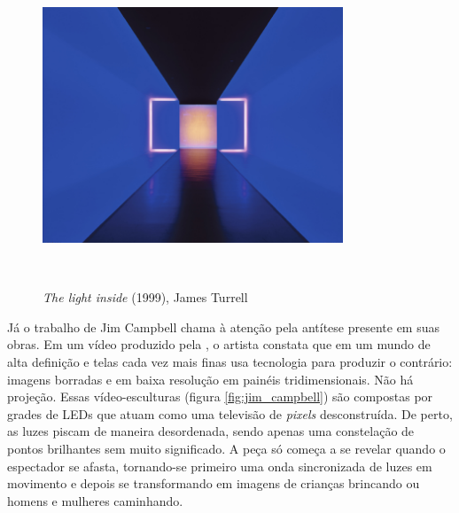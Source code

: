 \begin{figure}[H]
  \begin{center}
    \caption{\textit{The light inside} (1999), James Turrell}
    \vspace*{0,2cm}
    \includegraphics[width=0.8\textwidth]{./04-figuras/james_turrell}
    \label{fig:james_turrell}
  \end{center}
  \vspace*{-0,9cm}
  \\
\end{figure}

Já o trabalho de Jim Campbell chama à atenção pela antítese presente em suas obras. Em um vídeo produzido pela , o artista constata que em um mundo de alta definição e telas cada vez mais finas usa tecnologia para produzir o contrário: imagens borradas e em baixa resolução em painéis tridimensionais. Não há projeção. Essas vídeo-esculturas (figura \ref{fig:jim_campbell}) são compostas por grades de LEDs que atuam como uma televisão de \textit{pixels} desconstruída. De perto, as luzes piscam de maneira desordenada, sendo apenas uma constelação de pontos brilhantes sem muito significado. A peça só começa a se revelar quando o espectador se afasta, tornando-se primeiro uma onda sincronizada de luzes em movimento e depois se transformando em imagens de crianças brincando ou homens e mulheres caminhando. 

